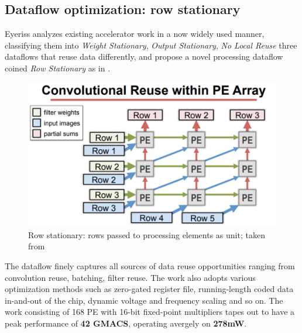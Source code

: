 \subsection{Dataflow optimization: row stationary}
Eyeriss\cite{Eyeriss} analyzes existing accelerator work in a now widely used manner, classifying them into \textit{Weight Stationary}, \textit{Output Stationary}, \textit{No Local Reuse} three dataflows that reuse data differently, and propose a novel processing dataflow coined \textit{Row Stationary} as in . \\
\begin{figure}
    \centering
\includegraphics[width=0.6\linewidth]{inc/2_related_work/figure/row_stationary.png}
    \caption{Row stationary: rows passed to processing elements as unit; taken from \cite{EyerissSlide}}
    \label{fig:row_stationary}
\end{figure}
The dataflow finely captures all sources of data reuse opportunities ranging from convolution reuse, batching, filter reuse. The work also adopts various optimization methods such as zero-gated register file, running-length coded data in-and-out of the chip, dynamic voltage and frequency scaling and so on. The work consisting of 168 PE with 16-bit fixed-point multipliers tapes out to have a peak performance of \textbf{42 GMACS}, operating avergely on \textbf{278mW}.

